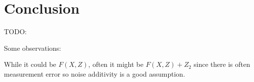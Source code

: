 \chapter{Conclusion}

TODO:

Some observations:

While it could be $F(X, Z)$, often it might be $F(X, Z) + Z_2$ since there is often measurement error
so noise additivity is a good assumption. 



